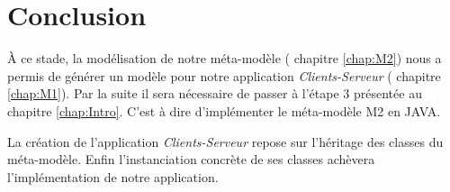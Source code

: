 \chapter{Conclusion}\label{chap:COnc}
À ce stade, la modélisation de notre méta-modèle (\cf{} chapitre \ref{chap:M2}) nous a permis de générer un modèle pour notre application \textit{Clients-Serveur} (\cf{} chapitre \ref{chap:M1}). Par la suite il sera nécessaire de passer à l'étape 3 présentée au chapitre \ref{chap:Intro}. C'est à dire  d'implémenter le méta-modèle M2 en JAVA.

La création de l'application \textit{Clients-Serveur} repose sur l'héritage des classes du méta-modèle. Enfin l'instanciation concrète de ses classes achèvera l'implémentation de notre application.


